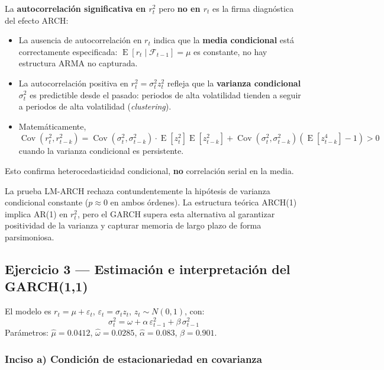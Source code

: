 \documentclass[12pt,a4paper]{article}
\DeclareMathOperator{\Cov}{Cov}
\DeclareMathOperator{\E}{E}
\begin{document}
\begin{solucion}
La \textbf{autocorrelación significativa en $r_t^2$} pero \textbf{no en $r_t$} es la firma diagnóstica del efecto ARCH:

\begin{itemize}[noitemsep]
  \item La ausencia de autocorrelación en $r_t$ indica que la \textbf{media condicional} está correctamente especificada: $\E[r_t\mid\mathcal{F}_{t-1}]=\mu$ es constante, no hay estructura ARMA no capturada.
  \item La autocorrelación positiva en $r_t^2 = \sigma_t^2 z_t^2$ refleja que la \textbf{varianza condicional} $\sigma_t^2$ es predictible desde el pasado: periodos de alta volatilidad tienden a seguir a periodos de alta volatilidad (\emph{clustering}).
  \item Matemáticamente, $\Cov(r_t^2, r_{t-k}^2) = \Cov(\sigma_t^2,\sigma_{t-k}^2)\cdot\E[z_t^2]\E[z_{t-k}^2] + \Cov(\sigma_t^2,\sigma_{t-k}^2)(\E[z_{t-k}^4]-1) > 0$ cuando la varianza condicional es persistente.
\end{itemize}

Esto confirma heterocedasticidad condicional, \textbf{no} correlación serial en la media.
\end{solucion}

\begin{hallazgo}
La prueba LM-ARCH rechaza contundentemente la hipótesis de varianza condicional constante ($p\approx0$ en ambos órdenes). La estructura teórica ARCH(1) implica AR(1) en $r_t^2$, pero el GARCH supera esta alternativa al garantizar positividad de la varianza y capturar memoria de largo plazo de forma parsimoniosa.
\end{hallazgo}

\subsection{Ejercicio 3 — Estimación e interpretación del GARCH(1,1)}

El modelo es $r_t = \mu + \varepsilon_t$, $\varepsilon_t=\sigma_t z_t$, $z_t\sim N(0,1)$, con:
\begin{equation}
\sigma_t^2 = \omega + \alpha\,\varepsilon_{t-1}^2 + \beta\,\sigma_{t-1}^2
\end{equation}
Parámetros: $\hat{\mu}=0.0412$, $\hat{\omega}=0.0285$, $\hat{\alpha}=0.083$, $\hat{\beta}=0.901$.

\subsubsection*{Inciso a) Condición de estacionariedad en covarianza}
\end{document}
